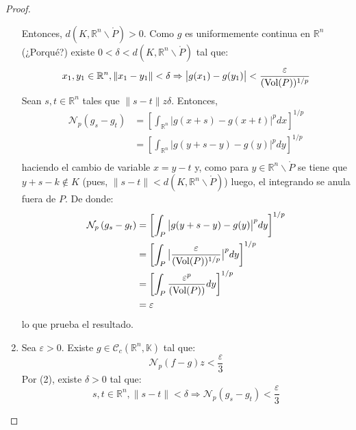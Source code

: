 \documentclass[12pt]{report}
\theoremstyle{largebreak}
\newcommand\abs[1]{\ensuremath{\big|#1\big|}}
\newcommand\norm[1]{\ensuremath{\|#1\|}}
\newcommand{\N}[2]{\ensuremath{\mathcal{N}_{#1}\left(#2\right)}}
\begin{document}
\begin{proof}
\begin{enumerate}
            Entonces, $d(K,\mathbb{R}^n\backslash\mathring{P})>0$. Como $g$ es uniformemente continua en $\mathbb{R}^n$ (¿Porqué?) existe $0<\delta<d(K,\mathbb{R}^n\backslash\mathring{P})$ tal que:
            \begin{equation*}
                x_1,y_1\in\mathbb{R}^n,\norm{x_1-y_1}<\delta\Rightarrow \abs{g(x_1)-g(y_1)}<\frac{\varepsilon}{(\textup{Vol}(P))^{1/p}}
            \end{equation*}
            Sean $s,t\in\mathbb{R}^n$ tales que $\norm{s-t}z\delta$. Entonces,
            \begin{equation*}
                \begin{split}
                    \N{p}{g_s-g_t}&=\left[\int_{\mathbb{R}^n}\abs{g(x+s)-g(x+t)}^pdx \right]^{1/p}\\
                    &=\left[\int_{\mathbb{R}^n}\abs{g(y+s-y)-g(y)}^pdy \right]^{1/p}\\
                \end{split}
            \end{equation*}
            haciendo el cambio de variable $x=y-t$ y, como para $y\in\mathbb{R}^n\backslash\mathring{P}$ se tiene que $y+s-k\notin K$ (pues, $\norm{s-t}<d(K,\mathbb{R}^n\backslash\mathring{P})$) luego, el integrando se anula fuera de $P$. De donde:
            \begin{equation*}
                \begin{split}
                    \N{p}{g_s-g_t}&=\left[\int_{P}\abs{g(y+s-y)-g(y)}^pdy \right]^{1/p}\\
                    &=\left[\int_{P}\abs{\frac{\varepsilon}{(\textup{Vol}(P))^{1/p}}}^pdy \right]^{1/p}\\
                    &=\left[\int_{P}\frac{\varepsilon^p}{(\textup{Vol}(P))}dy \right]^{1/p}\\
                    &=\varepsilon
                \end{split}
            \end{equation*}
            lo que prueba el resultado.
            \item Sea $\varepsilon>0$. Existe $g\in\mathcal{C}_c(\mathbb{R}^n,\mathbb{K})$ tal que:
            \begin{equation*}
                \N{p}{f-g}z<\frac{\varepsilon}{3}
            \end{equation*}
            Por (2), existe $\delta>0$ tal que:
            \begin{equation*}
                s,t\in\mathbb{R}^n,\norm{s-t}<\delta\Rightarrow\N{p}{g_s-g_t}<\frac{\varepsilon}{3}

\end{equation*}
\end{enumerate}
\end{proof}
\end{document}
